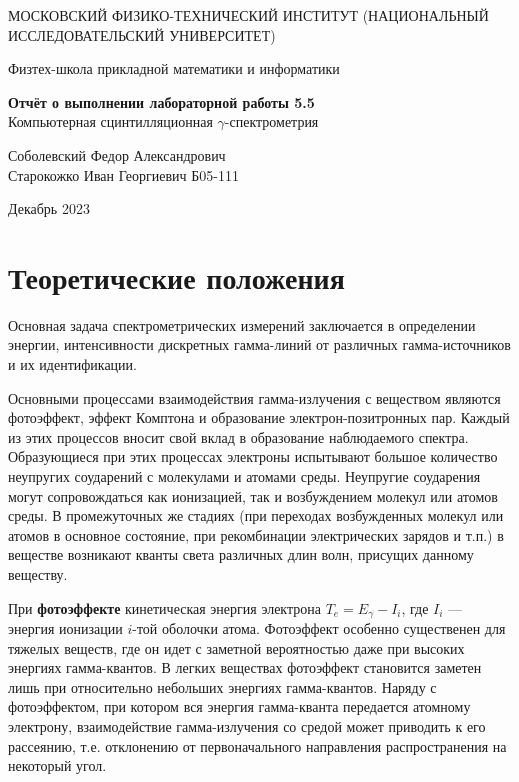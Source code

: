 \documentclass[a4paper,12pt]{article} %
\date{\today}
\begin{document}
\begin{titlepage}
	\begin{center}
		{\large МОСКОВСКИЙ ФИЗИКО-ТЕХНИЧЕСКИЙ ИНСТИТУТ (НАЦИОНАЛЬНЫЙ ИССЛЕДОВАТЕЛЬСКИЙ УНИВЕРСИТЕТ)}
	\end{center}
	\begin{center}
		{\large Физтех-школа прикладной математики и информатики}
	\end{center}
	
	
	\vspace{4.5cm}
	{\huge
		\begin{center}
			{\bf Отчёт о выполнении лабораторной работы 5.5}\\
			Компьютерная сцинтилляционная $\gamma$-спектрометрия
		\end{center}
	}
	\vspace{1cm}
	\begin{center}
		{\large Соболевский Федор Александрович \\
  Старокожко Иван Георгиевич
			\vspace{0.2cm}
			Б05-111}
	\end{center}
	\vspace{8cm}
	\begin{center}
		  Декабрь 2023
	\end{center}
\end{titlepage}

\section{Теоретические положения}
	
Основная задача спектрометрических измерений заключается в определении энергии, интенсивности дискретных гамма-линий от различных гамма-источников и их идентификации.
	
Основными процессами взаимодействия гамма-излучения с веществом являются фотоэффект, эффект Комптона и образование электрон-позитронных пар. Каждый из этих процессов вносит свой вклад в образование наблюдаемого спектра. Образующиеся при этих процессах электроны испытывают большое количество неупругих соударений с молекулами и атомами среды. Неупругие соударения могут сопровождаться как ионизацией, так и возбуждением молекул или атомов среды. В промежуточных же стадиях (при переходах возбужденных молекул или атомов в основное состояние, при рекомбинации электрических зарядов и т.п.) в веществе возникают кванты света различных длин волн, присущих данному веществу.
	
При \textbf{фотоэффекте} кинетическая энергия электрона $ T_e = E_\gamma - I_i $, где $ I_i $ --- энергия ионизации $ i $-той оболочки атома. Фотоэффект особенно существенен для тяжелых веществ, где он идет с заметной вероятностью даже при высоких энергиях гамма-квантов. В легких веществах фотоэффект становится заметен лишь при относительно небольших энергиях гамма-квантов. Наряду с фотоэффектом, при котором вся энергия гамма-кванта передается атомному электрону, взаимодействие гамма-излучения со средой может приводить к его рассеянию, т.е. отклонению от первоначального направления распространения на некоторый угол.
	
\end{document}
